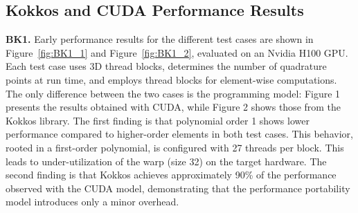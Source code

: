 \documentclass[a4paper,12pt]{article}
\begin{document}
\subsection{Kokkos and CUDA Performance Results}
{\bf BK1.} Early performance results for the different test cases are shown in Figure~\ref{fig:BK1_1} and Figure~\ref{fig:BK1_2}, evaluated on an Nvidia H100 GPU. Each test case uses 3D thread blocks, determines the number of quadrature points at run time, and employs thread blocks for element-wise computations. The only difference between the two cases is the programming model: Figure 1 presents the results obtained with CUDA, while Figure 2 shows those from the Kokkos library.
The first finding is that polynomial order 1 shows lower performance compared to higher-order elements in both test cases. This behavior, rooted in a first-order polynomial, is configured with 27 threads per block. This leads to under-utilization of the warp (size 32) on the target hardware.
The second finding is that Kokkos achieves approximately 90\% of the performance observed with the CUDA model, demonstrating that the performance portability model introduces only a minor overhead.
\end{document}
